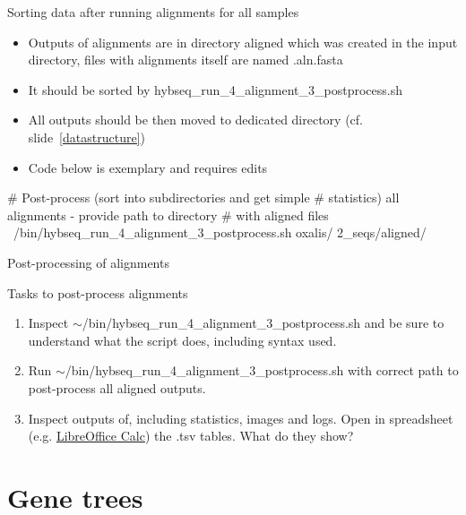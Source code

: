 \documentclass[compress, ucs, xelatex, 11pt, xcolor=x11names, aspectratio=1609,
	hyperref={
		bookmarks=true,
		unicode=true,
		colorlinks=true,
		pdftitle={HybSeq course},
		plainpages=false,
		pdfauthor={Vojtech Zeisek},
		pdfsubject={Practical processing of HybSeq target enrichment sequencing data on computing grids like MetaCentrum},
		pdfcreator={XeLaTeX},
		pdfkeywords={BASH, command line, GNU, HybSeq, Linux, MetaCentrum, sequencing shell, target enrichment},
		linkcolor=Cyan2, %
		anchorcolor=Firebrick2, %
		citecolor=Firebrick2, %
		filecolor=Firebrick2, %
		menucolor=Firebrick2, %
		urlcolor=Chartreuse2, %
		pdftex},
	url={hyphens, lowtilde} %
	]{beamer}
\renewcommand{\texttt}[1]{\colorbox{Snow4}{{\ttfamily #1}}}
\renewcommand{\alert}[1]{\textcolor{OrangeRed2}{#1}}
\begin{document}
\begin{frame}[fragile]{Sorting data after running alignments for all samples}
	\begin{itemize}
		\item Outputs of alignments are in directory \texttt{aligned} which was created in the input directory, files with alignments itself are named \texttt{*.aln.fasta}
		\item It should be sorted by \texttt{hybseq\_run\_4\_alignment\_3\_postprocess.sh}
		\item All outputs should be then moved to dedicated directory (cf. slide~\ref{datastructure})
		\item \alert{Code below is exemplary and requires edits}
	\end{itemize}
	\begin{bashcode}
    # Post-process (sort into subdirectories and get simple
    # statistics) all alignments - provide path to directory
    # with aligned files
    ~/bin/hybseq_run_4_alignment_3_postprocess.sh oxalis/
      2_seqs/aligned/
	\end{bashcode}
\end{frame}

\begin{frame}{Post-processing of alignments}
	\begin{exampleblock}{Tasks to post-process alignments}
		\begin{enumerate}
			\item Inspect \texttt{$\sim$/bin/hybseq\_run\_4\_alignment\_3\_postprocess.sh} and be sure to understand what the script does, including syntax used.
			\item Run \texttt{$\sim$/bin/hybseq\_run\_4\_alignment\_3\_postprocess.sh}  with correct path to post-process all aligned outputs.
			\item Inspect outputs of, including statistics, images and logs. Open in spreadsheet (e.g. \href{https://www.libreoffice.org/}{LibreOffice Calc}) the \texttt{*.tsv} tables. What do they show?
		\end{enumerate}
	\end{exampleblock}
\end{frame}

\section{Gene trees}
\end{document}
